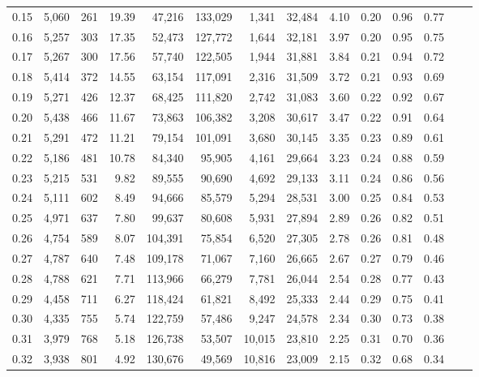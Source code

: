 \begin{tabular}{rrrrrrrrrrrrrr}
0.15 &  5,060 &  261 &   19.39 &   47,216 &  133,029 &   1,341 &  32,484 &  4.10 &  0.20 &  0.96 &      0.77 \\
0.16 &  5,257 &  303 &   17.35 &   52,473 &  127,772 &   1,644 &  32,181 &  3.97 &  0.20 &  0.95 &      0.75 \\
0.17 &  5,267 &  300 &   17.56 &   57,740 &  122,505 &   1,944 &  31,881 &  3.84 &  0.21 &  0.94 &      0.72 \\
0.18 &  5,414 &  372 &   14.55 &   63,154 &  117,091 &   2,316 &  31,509 &  3.72 &  0.21 &  0.93 &      0.69 \\
0.19 &  5,271 &  426 &   12.37 &   68,425 &  111,820 &   2,742 &  31,083 &  3.60 &  0.22 &  0.92 &      0.67 \\
0.20 &  5,438 &  466 &   11.67 &   73,863 &  106,382 &   3,208 &  30,617 &  3.47 &  0.22 &  0.91 &      0.64 \\
0.21 &  5,291 &  472 &   11.21 &   79,154 &  101,091 &   3,680 &  30,145 &  3.35 &  0.23 &  0.89 &      0.61 \\
0.22 &  5,186 &  481 &   10.78 &   84,340 &   95,905 &   4,161 &  29,664 &  3.23 &  0.24 &  0.88 &      0.59 \\
0.23 &  5,215 &  531 &    9.82 &   89,555 &   90,690 &   4,692 &  29,133 &  3.11 &  0.24 &  0.86 &      0.56 \\
0.24 &  5,111 &  602 &    8.49 &   94,666 &   85,579 &   5,294 &  28,531 &  3.00 &  0.25 &  0.84 &      0.53 \\
0.25 &  4,971 &  637 &    7.80 &   99,637 &   80,608 &   5,931 &  27,894 &  2.89 &  0.26 &  0.82 &      0.51 \\
0.26 &  4,754 &  589 &    8.07 &  104,391 &   75,854 &   6,520 &  27,305 &  2.78 &  0.26 &  0.81 &      0.48 \\
0.27 &  4,787 &  640 &    7.48 &  109,178 &   71,067 &   7,160 &  26,665 &  2.67 &  0.27 &  0.79 &      0.46 \\
0.28 &  4,788 &  621 &    7.71 &  113,966 &   66,279 &   7,781 &  26,044 &  2.54 &  0.28 &  0.77 &      0.43 \\
0.29 &  4,458 &  711 &    6.27 &  118,424 &   61,821 &   8,492 &  25,333 &  2.44 &  0.29 &  0.75 &      0.41 \\
0.30 &  4,335 &  755 &    5.74 &  122,759 &   57,486 &   9,247 &  24,578 &  2.34 &  0.30 &  0.73 &      0.38 \\
0.31 &  3,979 &  768 &    5.18 &  126,738 &   53,507 &  10,015 &  23,810 &  2.25 &  0.31 &  0.70 &      0.36 \\
0.32 &  3,938 &  801 &    4.92 &  130,676 &   49,569 &  10,816 &  23,009 &  2.15 &  0.32 &  0.68 &      0.34 \\

\end{tabular}
